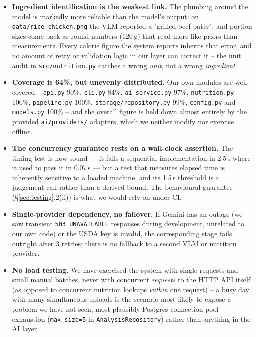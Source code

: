 \documentclass[11pt,a4paper]{article}
\begin{document}
\begin{itemize}[itemsep=4pt]
  \item \textbf{Ingredient identification is the weakest link.} The plumbing around the model is markedly more reliable than the model's output: on \texttt{data/rice\_chicken.png} the VLM reported a "grilled beef patty", and portion sizes come back as round numbers (120\,g) that read more like priors than measurements. Every calorie figure the system reports inherits that error, and no amount of retry or validation logic in our layer can correct it -- the unit audit in \texttt{src/nutrition.py} catches a wrong \emph{unit}, not a wrong \emph{ingredient}.
  \item \textbf{Coverage is 64\%, but unevenly distributed.} Our own modules are well covered -- \texttt{api.py} 90\%, \texttt{cli.py} 84\%, \texttt{ai\_service.py} 97\%, \texttt{nutrition.py} 100\%, \texttt{pipeline.py} 100\%, \texttt{storage/repository.py} 99\%, \texttt{config.py} and \texttt{models.py} 100\% -- and the overall figure is held down almost entirely by the provided \texttt{ai/providers/} adapters, which we neither modify nor exercise offline.
  \item \textbf{The concurrency guarantee rests on a wall-clock assertion.} The timing test is now sound --- it fails a sequential implementation in 2.5\,s where it used to pass it in 0.07\,s --- but a test that measures elapsed time is inherently sensitive to a loaded machine, and its 1.5\,s threshold is a judgement call rather than a derived bound. The behavioural guarantee (\S\ref{sec:testing}.2(ii)) is what we would rely on under CI.
  \item \textbf{Single-provider dependency, no failover.} If Gemini has an outage (we saw transient \texttt{503 UNAVAILABLE} responses during development, unrelated to our own code) or the USDA key is invalid, the corresponding stage fails outright after 3 retries; there is no fallback to a second VLM or nutrition provider.
  \item \textbf{No load testing.} We have exercised the system with single requests and small manual batches, never with concurrent \emph{requests} to the HTTP API itself (as opposed to concurrent nutrition lookups \emph{within} one request) -- a busy day with many simultaneous uploads is the scenario most likely to expose a problem we have not seen, most plausibly Postgres connection-pool exhaustion (\texttt{max\_size=5} in \texttt{AnalysisRepository}) rather than anything in the AI layer.
\end{itemize}
\end{document}
